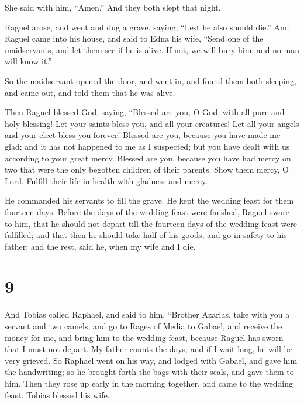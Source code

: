  She said with him, ``Amen.'' And they both slept that
night.

 Raguel arose, and went and dug a grave, 
saying, ``Lest he also should die.''  And Raguel came into
his house,  and said to Edna his wife, ``Send one of the
maidservants, and let them see if he is alive. If not, we will bury him,
and no man will know it.''

 So the maidservant opened the door, and went in, and found
them both sleeping,  and came out, and told them that he
was alive.

 Then Raguel blessed God, saying, ``Blessed are you, O God,
with all pure and holy blessing! Let your saints bless you, and all your
creatures! Let all your angels and your elect bless you forever!
 Blessed are you, because you have made me glad; and it has
not happened to me as I suspected; but you have dealt with us according
to your great mercy.  Blessed are you, because you have had
mercy on two that were the only begotten children of their parents. Show
them mercy, O Lord. Fulfill their life in health with gladness and
mercy.

 He commanded his servants to fill the grave. 
He kept the wedding feast for them fourteen days.  Before
the days of the wedding feast were finished, Raguel sware to him, that
he should not depart till the fourteen days of the wedding feast were
fulfilled;  and that then he should take half of his goods,
and go in safety to his father; and the rest, said he, when my wife and
I die.

\hypertarget{section-8}{%
\section{9}\label{section-8}}

 And Tobias called Raphael, and said to him, 
``Brother Azarias, take with you a servant and two camels, and go to
Rages of Media to Gabael, and receive the money for me, and bring him to
the wedding feast,  because Raguel has sworn that I must not
depart.  My father counts the days; and if I wait long, he
will be very grieved.  So Raphael went on his way, and
lodged with Gabael, and gave him the handwriting; so he brought forth
the bags with their seals, and gave them to him.  Then they
rose up early in the morning together, and came to the wedding feast.
Tobias blessed his wife.

